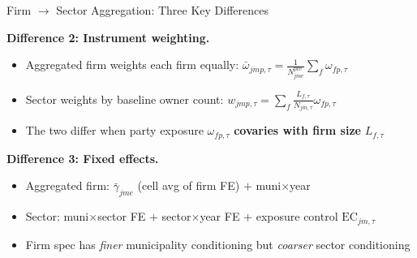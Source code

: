 \documentclass[aspectratio=169,11pt]{beamer}
\newcommand{\EC}{\mathrm{EC}}
\begin{document}
\begin{frame}[allowframebreaks]{Firm $\to$ Sector Aggregation: Three Key Differences}
\framebreak

\textbf{Difference 2: Instrument weighting.}
\begin{itemize}
    \item Aggregated firm weights each firm equally: $\bar{\omega}_{jmp,\tau} = \frac{1}{N^{\mathrm{pre}}_{jme}} \sum_f \omega_{fp,\tau}$
    \item Sector weights by baseline owner count: $w_{jmp,\tau} = \sum_f \frac{L_{f,\tau}}{N_{jm,\tau}} \omega_{fp,\tau}$
    \item The two differ when party exposure $\omega_{fp,\tau}$ \textbf{covaries with firm size} $L_{f,\tau}$
\end{itemize}

\medskip

\textbf{Difference 3: Fixed effects.}
\begin{itemize}
    \item Aggregated firm: $\bar{\gamma}_{jme}$ (cell avg of firm FE) $+$ muni$\times$year
    \item Sector: muni$\times$sector FE $+$ sector$\times$year FE $+$ exposure control $\EC_{jm,\tau}$
    \item Firm spec has \emph{finer} municipality conditioning but \emph{coarser} sector conditioning
\end{itemize}

\end{frame}
\end{document}
